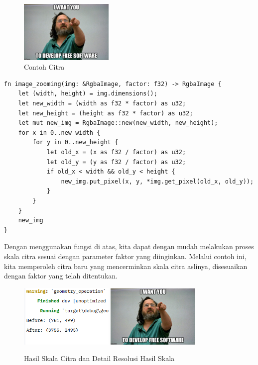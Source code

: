 \documentclass[a4paper,12pt,openany]{book}
\begin{document}
\begin{figure}[H]
    \centering
    \includegraphics[width=0.4\textwidth]{./image/geometry/stallman-meme.jpg}
    \caption{Contoh Citra}
\end{figure}

\begin{lstlisting}
fn image_zooming(img: &RgbaImage, factor: f32) -> RgbaImage {
    let (width, height) = img.dimensions();
    let new_width = (width as f32 * factor) as u32;
    let new_height = (height as f32 * factor) as u32;
    let mut new_img = RgbaImage::new(new_width, new_height);
    for x in 0..new_width {
        for y in 0..new_height {
            let old_x = (x as f32 / factor) as u32;
            let old_y = (y as f32 / factor) as u32;
            if old_x < width && old_y < height {
                new_img.put_pixel(x, y, *img.get_pixel(old_x, old_y));
            }
        }
    }
    new_img
}
\end{lstlisting}


Dengan menggunakan fungsi di atas,  kita dapat dengan mudah melakukan proses skala citra sesuai dengan parameter faktor yang diinginkan. Melalui contoh ini, kita memperoleh citra baru yang mencerminkan skala citra aslinya, disesuaikan dengan faktor yang telah ditentukan.

\begin{figure}[H]
    \centering
    \includegraphics[width=0.4\textwidth]{./image/geometry/image_zoom_res.png}
    \includegraphics[width=0.4\textwidth]{./image/geometry/stallman-meme-zoomed.jpg}
    \caption{Hasil Skala Citra dan Detail Resolusi Hasil Skala}
\end{figure}
\end{document}
